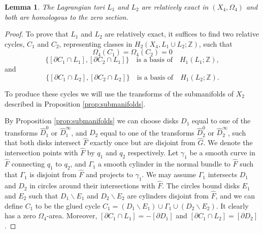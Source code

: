 \documentclass[12pt]{amsart}
\newtheorem{lemma}[theorem]{Lemma}
\theoremstyle{definition}
\newcommand{\ZZ}{{\mathbb Z}}
\begin{document}
\begin{lemma}\label{lem:pre}
    The Lagrangian tori $L_1$ and $L_2$ are relatively exact in $(X_4, \Omega_4)$ and both are homologous to the zero section.
\end{lemma}

\begin{proof}

To prove that $L_1$ and $L_2$ are relatively exact, it suffices to find two relative cycles,  $C_1$ and $C_2$, representing classes in $H_2(X_4, L_1 \cup L_2;\ZZ)$, such that 
\begin{equation}
\Omega_4(C_1) = \Omega_4(C_2) =0
\end{equation}
\begin{equation}
\{[\partial C_1 \cap L_1], [\partial C_2 \cap L_1]\}\quad \text{is a basis of} \quad   H_1(L_1;\ZZ),
\end{equation}
and 
\begin{equation}
\{[\partial C_1 \cap L_2], [\partial C_2 \cap L_2]\} \quad \text{is a basis of} \quad H_1(L_2;\ZZ).
\end{equation}

To produce these cycles we will use the transforms of the submanifolds of $X_2$ described in Proposition \ref{prop:submanifolds}.

By Proposition \ref{prop:submanifolds} we can choose disks $D_1$ equal to one of the transforms $\hat{D}^0_1$ or $\hat{D}^\infty_1$, and $D_2$ equal to one of the transforms $\hat{D}^0_2$ or $\hat{D}^\infty_2$, such that both disks intersect $\hat{F}$ exactly once but are disjoint from $\hat{G}$. We denote the intersection points with $\hat{F}$ by $q_1$ and $q_2$ respectively.
Let $\gamma_1$ be a smooth curve in $\hat{F}$ connecting $q_1$ to $q_2$, and $\Gamma_1$ a smooth cylinder in the normal bundle to $\hat{F}$ such that $\Gamma_1$ is disjoint from $\hat{F}$ and projects to $\gamma_1$. We may assume $\Gamma_1$ intersects $D_1$ and $D_2$ in circles around their intersections with $\hat{F}$. The circles bound disks $E_1$ and $E_2$ such that $D_1 \smallsetminus E_1$ and $D_2 \smallsetminus E_2$ are cylinders disjoint from $\hat{F}$, and we can define $C_1$ to be the glued cycle $C_1 = (D_1 \smallsetminus E_1) \cup \Gamma_1 \cup (D_2 \smallsetminus E_2)$. %
It clearly has a zero $\Omega_4$-area. Moreover,  $[\partial C_1 \cap L_1]=-[\partial D_1]$ and $[\partial C_1 \cap L_2]=[\partial D_2]$.


\end{proof}
\end{document}
